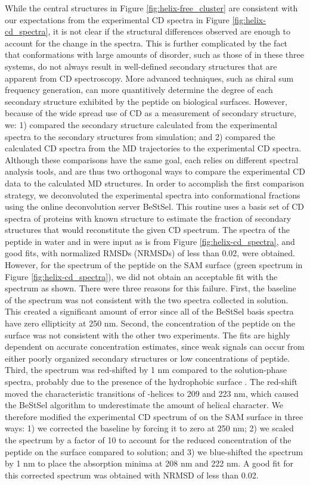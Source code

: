 While the central structures in Figure \ref{fig:helix-free_cluster} are consistent with our expectations from the experimental CD spectra in Figure \ref{fig:helix-cd_spectra}, it is not clear if the structural differences observed are enough to account for the change in the spectra. 
This is further complicated by the fact that conformations with large amounts of disorder, such as those of \pep{} in these three systems, do not always result in well-defined secondary structures that are apparent from CD spectroscopy. 
More advanced techniques, such as chiral sum frequency generation, can more quantitively determine the degree of each secondary structure exhibited by the peptide on biological surfaces\cite{Fu2011}. 
However, because of the wide spread use of CD as a measurement of secondary structure, we: 
1) compared the secondary structure calculated from the experimental spectra to the secondary structures from simulation; 
and 2) compared the calculated CD spectra from the MD trajectories to the experimental CD spectra. 
Although these comparisons have the same goal, each relies on different spectral analysis tools, and are thus two orthogonal ways to compare the experimental CD data to the calculated MD structures. 
In order to accomplish the first comparison strategy, we deconvoluted the experimental spectra into conformational fractions using the online deconvolution server BeStSel\cite{Micsonai2015, Micsonai2018}. 
This routine uses a basis set of CD spectra of proteins with known structure to estimate the fraction of secondary structures that would reconstitute the given CD spectrum. 
The spectra of the peptide in water and in \tbawat{} were input as is from Figure \ref{fig:helix-cd_spectra}, and good fits, with normalized RMSDs (NRMSDs) of less than 0.02, were obtained. 
However, for the spectrum of the peptide on the SAM surface (green spectrum in Figure \ref{fig:helix-cd_spectra}), we did not obtain an acceptable fit with the spectrum as shown. 
There were three reasons for this failure. 
First, the baseline of the spectrum was not consistent with the two spectra collected in solution. 
This created a significant amount of error since all of the BeStSel basis spectra have zero ellipticity at 250 nm. 
Second, the concentration of the peptide on the surface was not consistent with the other two experiments. 
The fits are highly dependent on accurate concentration estimates, since weak signals can occur from either poorly organized secondary structures or low concentrations of peptide. 
Third, the spectrum was red-shifted by 1 nm compared to the solution-phase spectra, probably due to the presence of the hydrophobic surface \cite{Chen1997}. 
The red-shift moved the characteristic transitions of \textalpha{}-helices to 209 and 223 nm, which caused the BeStSel algorithm to underestimate the amount of helical character. 
We therefore modified the experimental CD spectrum of \pep{} on the SAM surface in three ways: 
1) we corrected the baseline by forcing it to zero at 250 nm; 
2) we scaled the spectrum by a factor of 10 to account for the reduced concentration of the peptide on the surface compared to solution; and 
3) we blue-shifted the spectrum by 1 nm to place the absorption minima at 208 nm and 222 nm. 
A good fit for this corrected spectrum was obtained with NRMSD of less than 0.02. 

